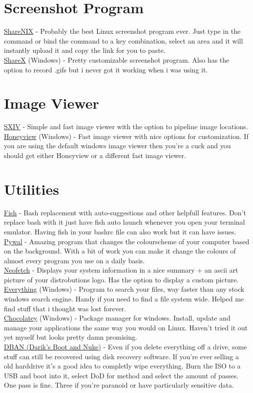 \documentclass{article}
\begin{document}
\section{Screenshot Program}
	\href{https://github.com/Francesco149/sharenix}{ShareNIX} - Probably the best Linux screenshot program ever. Just type in the command or bind the command to a key combination, select an area and it will instantly upload it and copy the link for you to paste.\\
	\href{https://getsharex.com/}{ShareX} (Windows) - Pretty customizable screenshot program. Also has the option to record .gifs but i never got it working when i was using it.
\section{Image Viewer}
	\href{https://github.com/muennich/sxiv}{SXIV} - Simple and fast image viewer with the option to pipeline image locations.\\
	\href{http://www.bandisoft.com/honeyview/}{Honeyview} (Windows) - Fast image viewer with nice options for customization. If you are using the default windows image viewer then you're a cuck and you should get either Honeyview or a different fast image viewer.
\section{Utilities}
	\href{https://fishshell.com/}{Fish} - Bash replacement with auto-suggestions and other helpfull features. Don't replace bash with it just have fish auto launch whenever you open your terminal emulator. Having fish in your bashrc file can also work but it can have issues.\\
	\href{https://github.com/dylanaraps/pywal}{Pywal} - Amazing program that changes the colourscheme of your computer based on the background. With a bit of work you can make it change the colours of almost every program you use on a daily basis.\\
	\href{https://github.com/dylanaraps/neofetch}{Neofetch} - Displays your system information in a nice summary + an ascii art picture of your distrobutions logo. Has the option to display a custom picture.\\
	\href{https://www.voidtools.com/}{Everything} (Windows) - Program to search your files, way faster than any stock windows search engine. Handy if you need to find a file system wide. Helped me find stuff that i thought was lost forever.\\
	\href{https://chocolatey.org/}{Chocolatey} (Windows) - Package manager for windows. Install, update and manage your applications the same way you would on Linux. Haven't tried it out yet myself but looks pretty damn promising.\\
	\href{https://dban.org/}{DBAN (Darik's Boot and Nuke)} - Even if you delete everything off a drive, some stuff can still be recovered using disk recovery software. If you're ever selling a old harddrive it's a good idea to completly wipe everything. Burn the ISO to a USB and boot into it, select DoD for method and select the amount of passes. One pass is fine. Three if you're paranoid or have particularly sensitive data.
\end{document}
